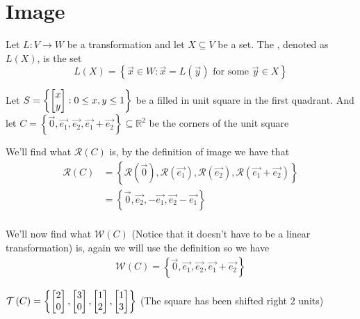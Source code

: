 \documentclass[11pt]{book}
\begin{document}

\section{Image}%
\label{sec:image}

\begin{defn}[Image]\label{defn:image}
    Let $L : V \to W $ be a transformation and let $X \subseteq V$ be a set. The
    , denoted as $L\left(X\right)$, is
    the set
    \begin{equation*}
        L\left(X\right) = \left\{ \vec{x} \in W: \vec{x} =
        L\left(\vec{y}\right) \text{ for some  } \vec{y} \in X \right\}
    \end{equation*}
\end{defn}

Let $S = \left\{ \begin{bmatrix} x \\ y \end{bmatrix}: 0 \le x, y \le 1 \right\}$ be a filled in unit
square in the first quadrant. And let $C = \left\{ \vec{0}, \vec{e_1},
\vec{e_2}, \vec{e_1} + \vec{e_2} \right\} \subseteq \mathbb{R}^2$ be the corners of the unit square 

\begin{ex}
    We'll find what $\mathcal{R}\left(C\right)$ is, by the definition of image we have that
    \begin{align*}
        \mathcal{R}\left(C\right) &= \left\{ \mathcal{R}\left(\vec{0}\right), \mathcal{R}\left(\vec{e_1}\right), \mathcal{R}\left(\vec{e_2}\right), \mathcal{R}\left(\vec{e_1} + \vec{e_2}\right) \right\}\\
                                  &= \left\{ \vec{0}, \vec{e_2}, -\vec{e_1}, \vec{e_2} - \vec{e_1} \right\}\\
    \end{align*}
\end{ex}

\begin{ex}
    We'll now find what $\mathcal{W}\left(C\right)$ (Notice that it doesn't have to be a linear transformation) is, again we will use the definition so we have
    \begin{align*}
        \mathcal{W}\left(C\right) = \left\{ \vec{0}, \vec{e_1}, \vec{e_2}, \vec{e_1} + \vec{e_2} \right\}
    \end{align*}
\end{ex}

\begin{ex}
    $\mathcal{T}\left(C\right) = \left\{ \begin{bmatrix} 2 \\ 0 \end{bmatrix}, \begin{bmatrix} 3 \\ 0 \end{bmatrix}, \begin{bmatrix} 1 \\ 2 \end{bmatrix}, \begin{bmatrix} 1 \\ 3 \end{bmatrix} \right\}$ (The square has been shifted right 2 units)
\end{ex}
\end{document}

